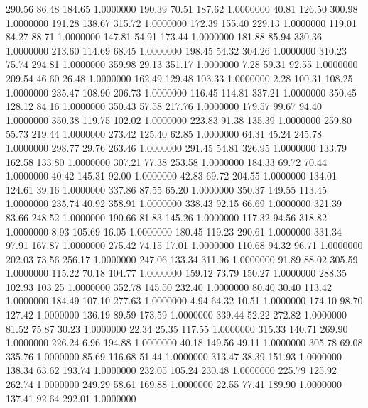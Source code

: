  290.56   86.48  184.65   1.0000000
 190.39   70.51  187.62   1.0000000
  40.81  126.50  300.98   1.0000000
 191.28  138.67  315.72   1.0000000
 172.39  155.40  229.13   1.0000000
 119.01   84.27   88.71   1.0000000
 147.81   54.91  173.44   1.0000000
 181.88   85.94  330.36   1.0000000
 213.60  114.69   68.45   1.0000000
 198.45   54.32  304.26   1.0000000
 310.23   75.74  294.81   1.0000000
 359.98   29.13  351.17   1.0000000
   7.28   59.31   92.55   1.0000000
 209.54   46.60   26.48   1.0000000
 162.49  129.48  103.33   1.0000000
   2.28  100.31  108.25   1.0000000
 235.47  108.90  206.73   1.0000000
 116.45  114.81  337.21   1.0000000
 350.45  128.12   84.16   1.0000000
 350.43   57.58  217.76   1.0000000
 179.57   99.67   94.40   1.0000000
 350.38  119.75  102.02   1.0000000
 223.83   91.38  135.39   1.0000000
 259.80   55.73  219.44   1.0000000
 273.42  125.40   62.85   1.0000000
  64.31   45.24  245.78   1.0000000
 298.77   29.76  263.46   1.0000000
 291.45   54.81  326.95   1.0000000
 133.79  162.58  133.80   1.0000000
 307.21   77.38  253.58   1.0000000
 184.33   69.72   70.44   1.0000000
  40.42  145.31   92.00   1.0000000
  42.83   69.72  204.55   1.0000000
 134.01  124.61   39.16   1.0000000
 337.86   87.55   65.20   1.0000000
 350.37  149.55  113.45   1.0000000
 235.74   40.92  358.91   1.0000000
 338.43   92.15   66.69   1.0000000
 321.39   83.66  248.52   1.0000000
 190.66   81.83  145.26   1.0000000
 117.32   94.56  318.82   1.0000000
   8.93  105.69   16.05   1.0000000
 180.45  119.23  290.61   1.0000000
 331.34   97.91  167.87   1.0000000
 275.42   74.15   17.01   1.0000000
 110.68   94.32   96.71   1.0000000
 202.03   73.56  256.17   1.0000000
 247.06  133.34  311.96   1.0000000
  91.89   88.02  305.59   1.0000000
 115.22   70.18  104.77   1.0000000
 159.12   73.79  150.27   1.0000000
 288.35  102.93  103.25   1.0000000
 352.78  145.50  232.40   1.0000000
  80.40   30.40  113.42   1.0000000
 184.49  107.10  277.63   1.0000000
   4.94   64.32   10.51   1.0000000
 174.10   98.70  127.42   1.0000000
 136.19   89.59  173.59   1.0000000
 339.44   52.22  272.82   1.0000000
  81.52   75.87   30.23   1.0000000
  22.34   25.35  117.55   1.0000000
 315.33  140.71  269.90   1.0000000
 226.24    6.96  194.88   1.0000000
  40.18  149.56   49.11   1.0000000
 305.78   69.08  335.76   1.0000000
  85.69  116.68   51.44   1.0000000
 313.47   38.39  151.93   1.0000000
 138.34   63.62  193.74   1.0000000
 232.05  105.24  230.48   1.0000000
 225.79  125.92  262.74   1.0000000
 249.29   58.61  169.88   1.0000000
  22.55   77.41  189.90   1.0000000
 137.41   92.64  292.01   1.0000000
